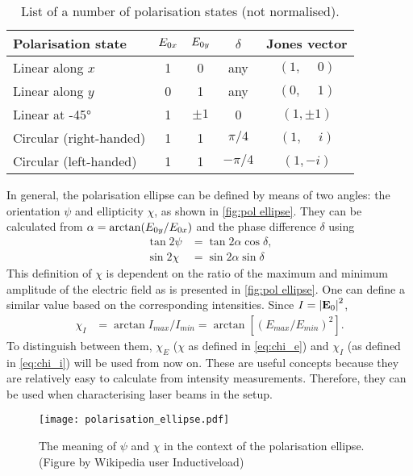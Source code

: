\begin{table}
	\centering
	\begin{tabular}{lcccc}
		\toprule
		Polarisation state      & $ E_{0x} $ & $ E_{0y} $ & $ \delta $ &     Jones vector      \\ \midrule
		Linear along $ x $      &    1     &    0     &    any     & $ (1, \phantom{-}0) $ \\
		Linear along $ y $      &    0     &    1     &    any     & $ (0, \phantom{-}1) $ \\
		Linear at \ang{+-45}    &    1     & $ \pm1 $ &     0      &     $ (1, \pm1) $     \\
		Circular (right-handed) &    1     &    1     & $ \pi/4 $  & $ (1, \phantom{-}i) $ \\
		Circular (left-handed)  &    1     &    1     & $ -\pi/4 $ &      $ (1, -i) $      \\ \bottomrule
	\end{tabular}
	\caption{List of a number of polarisation states (not normalised).}
	\label{tab:polarisation states}
\end{table}


In general, the polarisation ellipse can be defined by means of two angles: the orientation $ \psi$ and ellipticity $ \chi$, as shown in \autoref{fig:pol ellipse}. They can be calculated from $ \alpha = \arctan(E_{0y}/E_{0x}) $ and the phase difference $ \delta $ using
\begin{align}
	\tan 2\psi&= \tan 2\alpha \cos \delta,\\
	\sin 2\chi&= \sin 2\alpha \sin \delta \label{eq:chi_e}
\end{align}
This definition of $ \chi$ is dependent on the ratio of the maximum and minimum amplitude of the electric field as is presented in \autoref{fig:pol ellipse}. One can define a similar value based on the corresponding intensities. Since $ I = \abs{\vb{E}_0}^2 $,
\begin{align}
	\chi_I&= \arctan {I_\mathit{max}}/{I_\mathit{min}} = \arctan\left[ \left( {E_\mathit{max}}/{E_\mathit{min}} \right)^2 \right] . \label{eq:chi_i}
\end{align}
To distinguish between them, $ \chi_E $ ($ \chi$ as defined in \autoref{eq:chi_e}) and $ \chi_I$ (as defined in \autoref{eq:chi_i}) will be used from now on. These are useful concepts because they are relatively easy to calculate from intensity measurements. Therefore, they can be used when characterising laser beams in the setup.

\begin{figure}
	\centering
	\texttt{[image: polarisation\_ellipse.pdf]}
	\caption{
		The meaning of $ \psi$ and $ \chi$ in the context of the polarisation ellipse. (Figure by Wikipedia user Inductiveload)
	}
	\label{fig:pol ellipse}
\end{figure}

